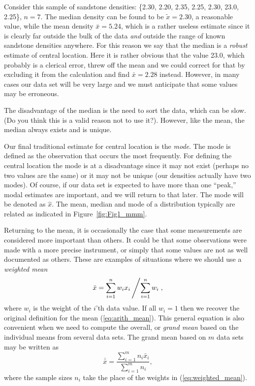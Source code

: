 	Consider this sample of sandstone densities: \{2.30, 2.20, 2.35, 2.25, 2.30, 23.0, 2.25\}, $n = 7$.  
The median density can be found to be $\tilde{x}  = 2.30$, a reasonable value, while the mean density $\bar{x} = 5.24$, 
which is a rather useless estimate since it is clearly far outside the bulk of the data \emph{and} outside
the range of known sandstone densities anywhere.  For this reason we 
say that the median is a \emph{robust} estimate of central location.  Here it is rather obvious that the value 
23.0, which probably is a clerical error, threw off the mean and we could correct for that by excluding
it from the calculation and find $\bar{x} = 2.28$ 
instead.  However, in many cases our data set will be very large and we must anticipate that some 
values may be erroneous.

	The disadvantage of the median is the need to sort the data, which can be slow. (Do you think this is
a valid reason not to use it?).  However, 
like the mean, the median always exists and is unique.

	Our final traditional estimate for central location is the \emph{mode}.  The mode is defined as 
the observation that occurs the most frequently.  For defining the central location the mode is at a 
disadvantage since it may not exist (perhaps no two values are the same) or it may not be unique (our 
densities actually have two modes).  Of course, if our data set is expected to have more than one ``peak,'' 
modal estimates are important, and we will return to that later.  The mode will be denoted as $\hat{x}$.  
The mean, median and mode of a distribution typically are related as indicated in
Figure~\ref{fig:Fig1_mmm}.
 

	Returning to the mean, it is occasionally the case that some measurements are considered 
more important than others.  It could be that some observations were made with a more precise 
instrument, or simply that some values are not as well documented as others.  These are 
examples of situations where we should use a \emph{weighted mean}
\begin{equation}
\bar{x} = \sum^n_{i=1} w_i x_i \left / \sum^n_{i=1} w_i \right.,
\label{eq:weighted_mean}
\end{equation}
where $w_i$ is the weight of the $i$'th data value.  If all $w_i = 1$ then we recover the original definition for the 
mean (\ref{eq:arith_mean}).  This general equation is also convenient when we need to compute the overall, or
\emph{grand mean} based on the individual means from several data sets.  The grand mean based on $m$ data sets may be 
written as
\begin{equation}
\bar{\bar{x}} = \frac{\sum^m _{i=1} n_i \bar{x}_i}{\sum^m_{i=1} n_i},
\end{equation}
where the sample sizes $n_i$ take the place of the weights in (\ref{eq:weighted_mean}).


